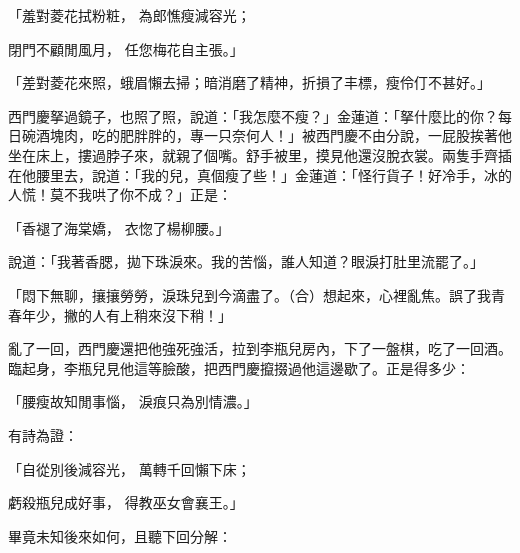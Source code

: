 「羞對菱花拭粉粧，  為郎憔瘦減容光；

閉門不顧閒風月，  任您梅花自主張。」

「差對菱花來照，蛾眉懶去掃；暗消磨了精神，折損了丰標，瘦伶仃不甚好。」

西門慶拏過鏡子，也照了照，說道：「我怎麼不瘦？」金蓮道：「拏什麼比的你？每日碗酒塊肉，吃的肥胖胖的，專一只奈何人！」被西門慶不由分說，一屁股挨著他坐在床上，摟過脖子來，就親了個嘴。舒手被里，摸見他還沒脫衣裳。兩隻手齊插在他腰里去，說道：「我的兒，真個瘦了些！」金蓮道：「怪行貨子！好冷手，冰的人慌！莫不我哄了你不成？」正是：

「香褪了海棠嬌，  衣惚了楊柳腰。」

說道：「我著香腮，拋下珠淚來。我的苦惱，誰人知道？眼淚打肚里流罷了。」

「悶下無聊，攘攘勞勞，淚珠兒到今滴盡了。（合）想起來，心裡亂焦。誤了我青春年少，撇的人有上稍來沒下稍！」

亂了一回，西門慶還把他強死強活，拉到李瓶兒房內，下了一盤棋，吃了一回酒。臨起身，李瓶兒見他這等臉酸，把西門慶攛掇過他這邊歇了。正是得多少：

「腰瘦故知閒事惱，  淚痕只為別情濃。」

有詩為證：

「自從別後減容光，  萬轉千回懶下床；

虧殺瓶兒成好事，  得教巫女會襄王。」

畢竟未知後來如何，且聽下回分解：
